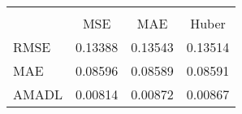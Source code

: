 \begin{tabular}{lccc}
\hline\hline \\ [-1.8ex]
 & MSE & MAE & Huber \\ 
 \hline 
RMSE & 0.13388 & 0.13543 & 0.13514 \\ 
MAE & 0.08596 & 0.08589 & 0.08591 \\ 
AMADL & 0.00814 & 0.00872 & 0.00867 \\ 
\hline\hline
\end{tabular}